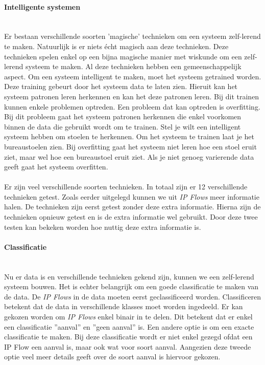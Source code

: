 \documentclass[notitlepage]{article}
\begin{document}
\paragraph{Intelligente systemen}\mbox{}\\
Er bestaan verschillende soorten 'magische' technieken om een systeem zelf-lerend te maken. Natuurlijk is er niets \'echt magisch aan deze technieken. Deze technieken spelen enkel op een bijna magische manier met wiskunde om een zelf-lerend systeem te maken. Al deze technieken hebben een gemeenschappelijk aspect. Om een systeem intelligent te maken, moet het systeem getrained worden. Deze training gebeurt door het systeem data te laten zien. Hieruit kan het systeem patronen leren herkennen en kan het deze patronen leren. Bij dit trainen kunnen enkele problemen optreden. Een probleem dat kan optreden is overfitting. Bij dit probleem gaat het systeem patronen herkennen die enkel voorkomen binnen de data die gebruikt wordt om te trainen. Stel je wilt een intelligent systeem hebben om stoelen te herkennen. Om het systeem te trainen laat je het bureaustoelen zien. Bij overfitting gaat het systeem niet leren hoe een stoel eruit ziet, maar wel hoe een bureaustoel eruit ziet. Als je niet genoeg varierende data geeft gaat het systeem overfitten. \\
\\
Er zijn veel verschillende soorten technieken. In totaal zijn er 12 verschillende technieken getest. Zoals eerder uitgelegd kunnen we uit \textit{IP Flows} meer informatie halen. De technieken zijn eerst getest zonder deze extra informatie. Hierna zijn de technieken opnieuw getest en is de extra informatie wel gebruikt. Door deze twee testen kan bekeken worden hoe nuttig deze extra informatie is.

\paragraph{Classificatie}\mbox{}\\
Nu er data is en verschillende technieken gekend zijn, kunnen we een zelf-lerend systeem bouwen. Het is echter belangrijk om een goede classificatie te maken van de data. De \textit{IP Flows} in de data moeten eerst geclassificeerd worden. Classificeren betekent dat de data in verschillende klasses moet worden ingedeeld. Er kan gekozen worden om \textit{IP Flows} enkel binair in te delen. Dit betekent dat er enkel een classificatie ''aanval'' en ''geen aanval'' is. Een andere optie is om een exacte classificatie te maken. Bij deze classificatie wordt er niet enkel gezegd ofdat een IP Flow een aanval is, maar ook wat voor soort aanval. Aangezien deze tweede optie veel meer details geeft over de soort aanval is hiervoor gekozen. 
\end{document}
